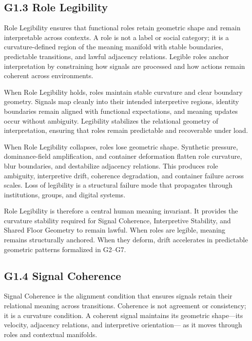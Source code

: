 \medskip

\subsection*{G1.3 Role Legibility}

\noindent Role Legibility ensures that functional roles retain geometric shape
and remain interpretable across contexts. A role is not a label or social
category; it is a curvature-defined region of the meaning manifold with stable
boundaries, predictable transitions, and lawful adjacency relations. Legible
roles anchor interpretation by constraining how signals are processed and how
actions remain coherent across environments.

\medskip

\noindent When Role Legibility holds, roles maintain stable curvature and clear
boundary geometry. Signals map cleanly into their intended interpretive regions,
identity boundaries remain aligned with functional expectations, and meaning
updates occur without ambiguity. Legibility stabilizes the relational geometry
of interpretation, ensuring that roles remain predictable and recoverable under
load.

\medskip

\noindent When Role Legibility collapses, roles lose geometric shape. Synthetic
pressure, dominance-field amplification, and container deformation flatten role
curvature, blur boundaries, and destabilize adjacency relations. This produces
role ambiguity, interpretive drift, coherence degradation, and container failure
across scales. Loss of legibility is a structural failure mode that propagates
through institutions, groups, and digital systems.

\medskip

\noindent Role Legibility is therefore a central human meaning invariant. It
provides the curvature stability required for Signal Coherence, Interpretive
Stability, and Shared Floor Geometry to remain lawful. When roles are legible,
meaning remains structurally anchored. When they deform, drift accelerates in
predictable geometric patterns formalized in G2--G7.


\subsection*{G1.4 Signal Coherence}

\noindent Signal Coherence is the alignment condition that ensures signals retain
their relational meaning across transitions. Coherence is not agreement or
consistency; it is a curvature condition. A coherent signal maintains its
geometric shape—its velocity, adjacency relations, and interpretive orientation—
as it moves through roles and contextual manifolds.

